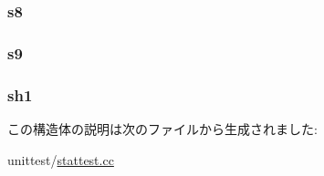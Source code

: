 \label{structStatTest_a0c506a7cfb55f45194895569a3e5d8b4}
\hypertarget{structStatTest_a696649756758760e13bca9954c601e83}{
\subsubsection[{s8}]{ {\bf s8}}}
\label{structStatTest_a696649756758760e13bca9954c601e83}
\hypertarget{structStatTest_ab6009c1c23dd54521e3a91b118c10796}{
\subsubsection[{s9}]{ {\bf s9}}}
\label{structStatTest_ab6009c1c23dd54521e3a91b118c10796}
\hypertarget{structStatTest_a7af6b54666aef413b44f4672b6b353c6}{
\subsubsection[{sh1}]{ {\bf sh1}}}
\label{structStatTest_a7af6b54666aef413b44f4672b6b353c6}


この構造体の説明は次のファイルから生成されました:\begin{DoxyCompactItemize}
\item 
unittest/\hyperlink{stattest_8cc}{stattest.cc}\end{DoxyCompactItemize}
